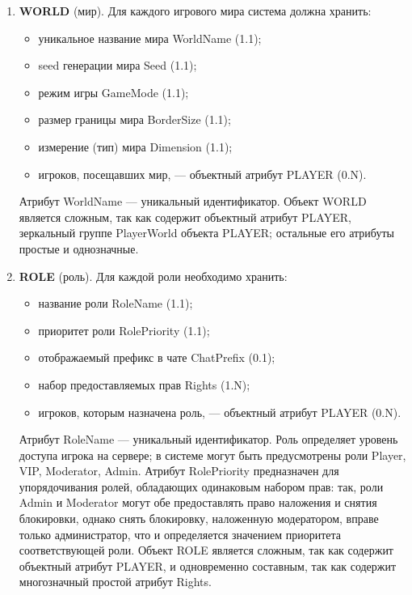 \documentclass[a4paper, 14pt]{extarticle}
\begin{document}
\begin{enumerate}
    \item \textbf{WORLD} (мир). Для каждого игрового мира система должна хранить:
    \begin{itemize}
        \item уникальное название мира WorldName (1.1);
        \item seed генерации мира Seed (1.1);
        \item режим игры GameMode (1.1);
        \item размер границы мира BorderSize (1.1);
        \item измерение (тип) мира Dimension (1.1);
        \item игроков, посещавших мир, --- объектный атрибут PLAYER (0.N).
    \end{itemize}
    Атрибут WorldName --- уникальный идентификатор. Объект WORLD является сложным, так как содержит объектный атрибут PLAYER, зеркальный группе PlayerWorld объекта PLAYER; остальные его атрибуты простые и однозначные.

    \item \textbf{ROLE} (роль). Для каждой роли необходимо хранить:
    \begin{itemize}
        \item название роли RoleName (1.1);
        \item приоритет роли RolePriority (1.1);
        \item отображаемый префикс в чате ChatPrefix (0.1);
        \item набор предоставляемых прав Rights (1.N);
        \item игроков, которым назначена роль, --- объектный атрибут PLAYER (0.N).
    \end{itemize}
    Атрибут RoleName --- уникальный идентификатор. Роль определяет уровень доступа игрока на сервере; в системе могут быть предусмотрены роли Player, VIP, Moderator, Admin. Атрибут RolePriority предназначен для упорядочивания ролей, обладающих одинаковым набором прав: так, роли Admin и Moderator могут обе предоставлять право наложения и снятия блокировки, однако снять блокировку, наложенную модератором, вправе только администратор, что и определяется значением приоритета соответствующей роли. Объект ROLE является сложным, так как содержит объектный атрибут PLAYER, и одновременно составным, так как содержит многозначный простой атрибут Rights.


\end{enumerate}
\end{document}
